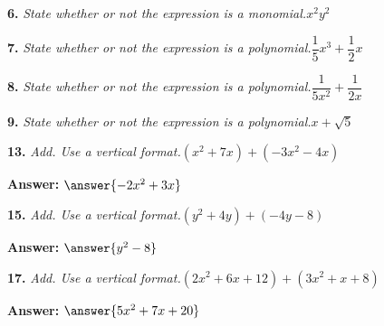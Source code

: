 \documentclass{ximera}
\begin{document}
\begin{problem}
\textbf{6.} \emph{State whether or not the expression is a monomial.}\quad $x^2y^2$

\begin{multipleChoice}
\end{multipleChoice}
\end{problem}

\begin{problem}
\textbf{7.} \emph{State whether or not the expression is a polynomial.}\quad $\dfrac{1}{5}x^3 + \dfrac{1}{2}x$

\begin{multipleChoice} 
\end{multipleChoice}
\end{problem}

\begin{problem}
\textbf{8.} \emph{State whether or not the expression is a polynomial.}\quad $\dfrac{1}{5x^2} + \dfrac{1}{2x}$

\begin{multipleChoice}
\end{multipleChoice}
\end{problem}

\begin{problem}
\textbf{9.} \emph{State whether or not the expression is a polynomial.}\quad $x + \sqrt{5}$

\begin{multipleChoice} 
\end{multipleChoice}
\end{problem}

\begin{problem}
\textbf{13.} \emph{Add. Use a vertical format.}\quad $(x^2 + 7x) + (-3x^2 - 4x)$

\textbf{Answer:} $\answer{-2x^2 +3x}$
\end{problem}

\begin{problem}
\textbf{15.} \emph{Add. Use a vertical format.}\quad $(y^2 + 4y) + (-4y - 8)$

\textbf{Answer:} $\answer{y^2 -8}$
\end{problem}

\begin{problem}
\textbf{17.} \emph{Add. Use a vertical format.}\quad $(2x^2 + 6x + 12) + (3x^2 + x + 8)$

\textbf{Answer:} $\answer{5x^2 +7x +20}$
\end{problem}
\end{document}
